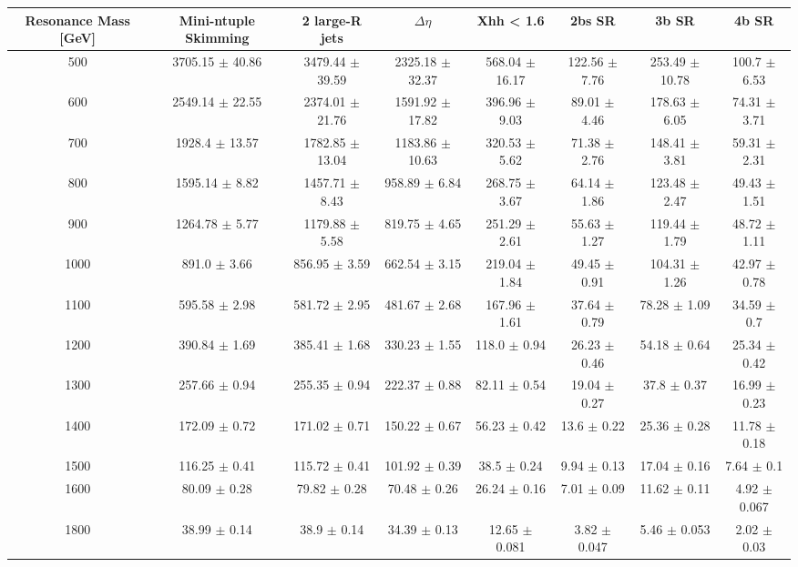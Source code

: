 \begin{footnotesize} 
\begin{tabular}{c|c|c|c|c|c|c|c} 
Resonance Mass [GeV] & Mini-ntuple Skimming & 2 large-R jets & $\Delta\eta$ & Xhh < 1.6 & 2bs SR & 3b SR & 4b SR \\ 
\hline\hline 
500 & 3705.15 $\pm$ 40.86 & 3479.44 $\pm$ 39.59 & 2325.18 $\pm$ 32.37 & 568.04 $\pm$ 16.17 & 122.56 $\pm$ 7.76 & 253.49 $\pm$ 10.78 & 100.7 $\pm$ 6.53\\ 
600 & 2549.14 $\pm$ 22.55 & 2374.01 $\pm$ 21.76 & 1591.92 $\pm$ 17.82 & 396.96 $\pm$ 9.03 & 89.01 $\pm$ 4.46 & 178.63 $\pm$ 6.05 & 74.31 $\pm$ 3.71\\ 
700 & 1928.4 $\pm$ 13.57 & 1782.85 $\pm$ 13.04 & 1183.86 $\pm$ 10.63 & 320.53 $\pm$ 5.62 & 71.38 $\pm$ 2.76 & 148.41 $\pm$ 3.81 & 59.31 $\pm$ 2.31\\ 
800 & 1595.14 $\pm$ 8.82 & 1457.71 $\pm$ 8.43 & 958.89 $\pm$ 6.84 & 268.75 $\pm$ 3.67 & 64.14 $\pm$ 1.86 & 123.48 $\pm$ 2.47 & 49.43 $\pm$ 1.51\\ 
900 & 1264.78 $\pm$ 5.77 & 1179.88 $\pm$ 5.58 & 819.75 $\pm$ 4.65 & 251.29 $\pm$ 2.61 & 55.63 $\pm$ 1.27 & 119.44 $\pm$ 1.79 & 48.72 $\pm$ 1.11\\ 
1000 & 891.0 $\pm$ 3.66 & 856.95 $\pm$ 3.59 & 662.54 $\pm$ 3.15 & 219.04 $\pm$ 1.84 & 49.45 $\pm$ 0.91 & 104.31 $\pm$ 1.26 & 42.97 $\pm$ 0.78\\ 
1100 & 595.58 $\pm$ 2.98 & 581.72 $\pm$ 2.95 & 481.67 $\pm$ 2.68 & 167.96 $\pm$ 1.61 & 37.64 $\pm$ 0.79 & 78.28 $\pm$ 1.09 & 34.59 $\pm$ 0.7\\ 
1200 & 390.84 $\pm$ 1.69 & 385.41 $\pm$ 1.68 & 330.23 $\pm$ 1.55 & 118.0 $\pm$ 0.94 & 26.23 $\pm$ 0.46 & 54.18 $\pm$ 0.64 & 25.34 $\pm$ 0.42\\ 
1300 & 257.66 $\pm$ 0.94 & 255.35 $\pm$ 0.94 & 222.37 $\pm$ 0.88 & 82.11 $\pm$ 0.54 & 19.04 $\pm$ 0.27 & 37.8 $\pm$ 0.37 & 16.99 $\pm$ 0.23\\ 
1400 & 172.09 $\pm$ 0.72 & 171.02 $\pm$ 0.71 & 150.22 $\pm$ 0.67 & 56.23 $\pm$ 0.42 & 13.6 $\pm$ 0.22 & 25.36 $\pm$ 0.28 & 11.78 $\pm$ 0.18\\ 
1500 & 116.25 $\pm$ 0.41 & 115.72 $\pm$ 0.41 & 101.92 $\pm$ 0.39 & 38.5 $\pm$ 0.24 & 9.94 $\pm$ 0.13 & 17.04 $\pm$ 0.16 & 7.64 $\pm$ 0.1\\ 
1600 & 80.09 $\pm$ 0.28 & 79.82 $\pm$ 0.28 & 70.48 $\pm$ 0.26 & 26.24 $\pm$ 0.16 & 7.01 $\pm$ 0.09 & 11.62 $\pm$ 0.11 & 4.92 $\pm$ 0.067\\ 
1800 & 38.99 $\pm$ 0.14 & 38.9 $\pm$ 0.14 & 34.39 $\pm$ 0.13 & 12.65 $\pm$ 0.081 & 3.82 $\pm$ 0.047 & 5.46 $\pm$ 0.053 & 2.02 $\pm$ 0.03\\ 

\end{tabular}
\end{footnotesize}

